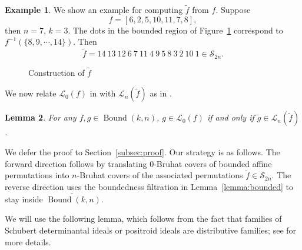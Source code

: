 \documentclass[12pt,reqno]{amsart}
\newtheorem{lemma}{Lemma}[section]
\theoremstyle{definition}
\newtheorem{example}[lemma]{Example}
\newcommand{\symm}{\mathcal{S}}
\newcommand{\bound}{\operatorname{Bound}}
\newcommand{\Lenart}{\mathcal{L}}
\begin{document}
{\begin{example}
    We show an example for computing $\widetilde{f}$ from $f$. Suppose \[f=[6,2,5,10,11,7,8],\] then $n=7$, $k=3$. The dots in the bounded region of Figure~\ref{fig:f-tilde} correspond to $f^{-1}(\{8,9,\cdots,14\})$. 
    Then \[\widetilde{f}=14\ 13\ 12\ 6\ 7\ 11\ 4\ 9\ 5\ 8\ 3\ 2\ 10\ 1 \in \symm_{2n}.\]
\end{example}

\begin{figure}

\caption{Construction of $\widetilde{f}$}
\label{fig:f-tilde}

    \end{figure}
We now relate $\Lenart_0(f)$ in  with $\Lenart_n(\widetilde{f})$ as in .

\begin{lemma}\label{lemma:relateL}
    For any $f,g\in \bound(k,n)$, $g\in \Lenart_0(f)$ if and only if $\widetilde{g}\in \Lenart_{n}(\widetilde{f})$.
\end{lemma}

We defer the proof to Section~\ref{subsec:proof}. Our strategy is as follows.
The forward direction follows by translating \(0\)-Bruhat covers of bounded affine permutations into
\(n\)-Bruhat covers of the associated permutations \(\widetilde f\in \symm_{2n}\).
The reverse direction uses the boundedness filtration in Lemma~\ref{lemma:bounded} to stay inside \(\widetilde{\bound(k,n)}\).   

We will use the following lemma, which follows from the fact that families of Schubert determinantal ideals or positroid ideals are distributive families; see  for more details.

}
\end{document}
